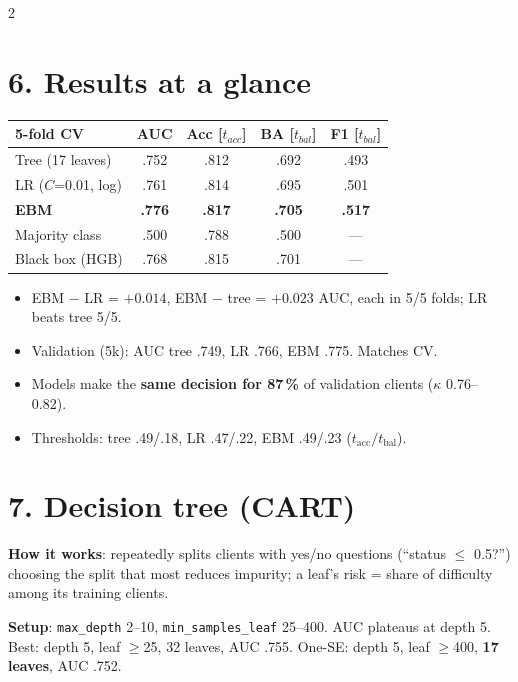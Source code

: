 \documentclass[a4paper,9pt]{extarticle}
\begin{document}
\begin{multicols}{2}
\section{6. Results at a glance}
{\small
\setlength{\tabcolsep}{3pt}
\begin{tabular}{@{}lcccc@{}}
\toprule
5-fold CV & AUC & Acc [$t_{acc}$] & BA [$t_{bal}$] & F1 [$t_{bal}$] \\
\midrule
\textcolor{treecol}{Tree} (17 leaves) & .752 & .812 & .692 & .493 \\
\textcolor{lrcol}{LR} ($C$=0.01, log) & .761 & .814 & .695 & .501 \\
\textcolor{ebmcol}{\textbf{EBM}} & \textbf{.776} & \textbf{.817} & \textbf{.705} & \textbf{.517} \\
Majority class & .500 & .788 & .500 & --- \\
Black box (HGB) & .768 & .815 & .701 & --- \\
\bottomrule
\end{tabular}}

\begin{itemize}
\item EBM $-$ LR = $+0.014$, EBM $-$ tree = $+0.023$ AUC, each in 5/5 folds; LR beats tree 5/5.
\item Validation (5k): AUC tree .749, LR .766, EBM .775. Matches CV.
\item Models make the \textbf{same decision for 87\,\%} of validation clients ($\kappa$ 0.76--0.82).
\item Thresholds: tree .49/.18, LR .47/.22, EBM .49/.23 ($t_{\text{acc}}/t_{\text{bal}}$).
\end{itemize}

\section{7. Decision tree (CART)}
\textbf{How it works}: repeatedly splits clients with yes/no questions (``status $\leq$ 0.5?'') choosing the split
that most reduces impurity; a leaf's risk = share of difficulty among its training clients.

\textbf{Setup}: \texttt{max\_depth} 2--10, \texttt{min\_samples\_leaf} 25--400. AUC plateaus at depth 5. Best:
depth 5, leaf $\geq$25, 32 leaves, AUC .755. One-SE: depth 5, leaf $\geq$400, \textbf{17 leaves}, AUC .752.


\end{multicols}
\end{document}
